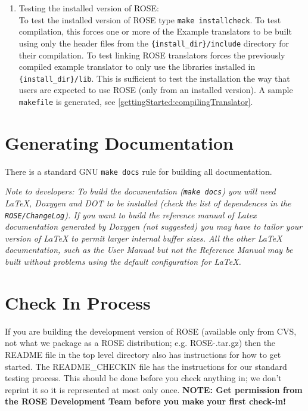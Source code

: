 \begin{enumerate}
     \item Testing the installed version of ROSE: \\
     To test the installed version of ROSE type {\tt make installcheck}.  To test
     compilation, this forces one
     or more of the Example translators to be built using only the header files from
     the {\tt \{install\_dir\}/include} directory for their compilation.  To test linking
     ROSE translators forces the previously compiled example translator to only use the libraries
     installed in {\tt \{install\_dir\}/lib}.  This is sufficient to test the installation
     the way that users are expected to use ROSE (only from an installed version).
     A sample {\tt makefile} is generated, see \ref{gettingStarted:compilingTranslator}.

\end{enumerate}

\section{Generating Documentation}
   There is a standard GNU {\tt make docs} rule for building all documentation.

{\it Note to developers: To build the documentation ({\tt make docs}) you will need 
LaTeX, Doxygen and DOT to be installed (check the list of dependences in the 
{\tt ROSE/ChangeLog}). If you want to build the reference manual of Latex documentation
generated by Doxygen (not suggested) you may have to tailor your version of LaTeX to 
permit larger internal buffer sizes.  All the other LaTeX documentation, such as the
User Manual but not the Reference Manual may be built without problems using the 
default configuration for LaTeX.
}

\section{Check In Process}
   If you are building the development version of ROSE (available only from CVS, not what 
we package as a ROSE distribution; e.g. ROSE-\VersionNumber.tar.gz) then the README
file in the top level directory also has instructions for how to get started. 
The README\_CHECKIN file has the instructions for our standard testing process.
This should be done before you check anything in; we don't reprint it so it is
represented at most only once.
{\bf NOTE: Get permission from the ROSE Development Team before you make your first check-in!}




